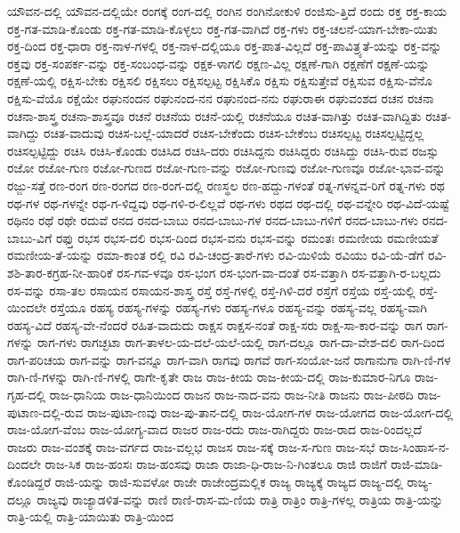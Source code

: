 {ಯೌವನ-ದಲ್ಲಿ
ಯೌವನ-ದಲ್ಲಿಯೇ
ರಂಗಕ್ಕೆ
ರಂಗ-ದಲ್ಲಿ
ರಂಗಿನ
ರಂಗಿನೋಕುಳಿ
ರಂಜಿಸು-ತ್ತಿದೆ
ರಂದು
ರಕ್ತ
ರಕ್ತ-ಕಾಯ
ರಕ್ತ-ಗತ-ಮಾಡಿ-ಕೊಂಡು
ರಕ್ತ-ಗತ-ಮಾಡಿ-ಕೊಳ್ಳಲು
ರಕ್ತ-ಗತ-ವಾಗಿದೆ
ರಕ್ತ-ಗಳು
ರಕ್ತ-ಚಲನೆ-ಯಾಗ-ಬೇಕಾ-ಯಿತು
ರಕ್ತ-ದಿಂದ
ರಕ್ತ-ಧಾರಾ
ರಕ್ತ-ನಾಳ-ಗಳಲ್ಲಿ
ರಕ್ತ-ನಾಳ-ದಲ್ಲಿಯೂ
ರಕ್ತ-ಪಾತ-ವಿಲ್ಲದೆ
ರಕ್ತ-ಪಾವಿತ್ರ್ಯತೆ-ಯನ್ನು
ರಕ್ತ-ವನ್ನು
ರಕ್ತವು
ರಕ್ತ-ಸಂಪರ್ಕ-ವನ್ನು
ರಕ್ತ-ಸಂಬಂಧ-ವನ್ನು
ರಕ್ಷಕ-ಳಾಗಲಿ
ರಕ್ಷಣ-ವಿಲ್ಲ
ರಕ್ಷಣೆ-ಗಾಗಿ
ರಕ್ಷಣೆಗೆ
ರಕ್ಷಣೆ-ಯನ್ನು
ರಕ್ಷಣೆ-ಯಲ್ಲಿ
ರಕ್ಷಿಸ-ಬೇಕು
ರಕ್ಷಿಸಲಿ
ರಕ್ಷಿಸಲು
ರಕ್ಷಿಸಲ್ಪಟ್ಟ
ರಕ್ಷಿಸಿಕೊ
ರಕ್ಷಿಸು
ರಕ್ಷಿಸುತ್ತೇವೆ
ರಕ್ಷಿಸುವ
ರಕ್ಷಿಸು-ವೆನೊ
ರಕ್ಷಿಸು-ವೆಯೊ
ರಕ್ಷೆಯೇ
ರಘುನಂದನ
ರಘುನಂದ-ನನ
ರಘುನಂದ-ನನು
ರಘುರಾಈ
ರಘುವಂಶದ
ರಚನ
ರಚನಾ
ರಚನಾ-ಶಾಸ್ತ್ರ
ರಚನಾ-ಶಾಸ್ತ್ರವೂ
ರಚನೆ
ರಚನೆಯ
ರಚನೆ-ಯಲ್ಲಿ
ರಚನೆಯೂ
ರಚಿತ-ವಾಗಿತ್ತು
ರಚಿತ-ವಾಗಿದ್ದಿತು
ರಚಿತ-ವಾಗಿದ್ದು
ರಚಿತ-ವಾದುವು
ರಚಿಸ-ಬಲ್ಲೆ-ಯಾದರೆ
ರಚಿಸ-ಬೇಕೆಂದು
ರಚಿಸ-ಬೇಕೆಂಬ
ರಚಿಸಲ್ಪಟ್ಟ
ರಚಿಸಲ್ಪಟ್ಟಿದ್ದಲ್ಲ
ರಚಿಸಲ್ಪಟ್ಟಿದ್ದು
ರಚಿಸಿ
ರಚಿಸಿ-ಕೊಂಡು
ರಚಿಸಿದ
ರಚಿಸಿ-ದರು
ರಚಿಸಿದ್ದನು
ರಚಿಸಿದ್ದರು
ರಚಿಸಿದ್ದು
ರಚಿಸಿ-ರುವ
ರಜಸ್ಸು
ರಜೋ
ರಜೋ-ಗುಣ
ರಜೋ-ಗುಣದ
ರಜೋ-ಗುಣ-ವನ್ನು
ರಜೋ-ಗುಣವು
ರಜೋ-ಗುಣವೂ
ರಜೋ-ಭಾವ-ವನ್ನು
ರಜ್ಜು-ಸತ್ತೆ
ರಣ-ರಂಗ
ರಣ-ರಂಗದ
ರಣ-ರಂಗ-ದಲ್ಲಿ
ರಣಸ್ಥಲ
ರಣ-ಹದ್ದು-ಗಳಂತೆ
ರತ್ನ-ಗಳನ್ನವ-ರಿಗೆ
ರತ್ನ-ಗಳು
ರಥ
ರಥ-ಗಳ
ರಥ-ಗಳನ್ನೇ
ರಥ-ಗ-ಳಿದ್ದವು
ರಥ-ಗಳಿ-ರ-ಲಿಲ್ಲವೆ
ರಥ-ಗಳು
ರಥದ
ರಥ-ದಲ್ಲಿ
ರಥ-ವನ್ನೇರಿ
ರಥ-ವಿದೆ-ಯಷ್ಟೆ
ರಥಿನಂ
ರಥೆ
ರಥೇ
ರದುವೆ
ರನದ
ರನದ-ಬಾಬು
ರನದ-ಬಾಬು-ಗಳ
ರನದ-ಬಾಬು-ಗಳಿಗೆ
ರನದ-ಬಾಬು-ಗಳು
ರನದ-ಬಾಬು-ವಿಗೆ
ರಫ್ತು
ರಭಸ
ರಭಸ-ದಲಿ
ರಭಸ-ದಿಂದ
ರಭಸ-ವನು
ರಭಸ-ವನ್ನು
ರಮಂತಃ
ರಮಣೀಯ
ರಮಣೀಯತೆ
ರಮಣೀಯ-ತೆ-ಯನ್ನು
ರಮಾ-ಕಾಂತ
ರಲ್ಲಿ
ರವಿ
ರವಿ-ಚಂದ್ರ-ತಾರೆ-ಗಳು
ರವಿ-ಯಿಳಿಯೆ
ರವಿಯು
ರವಿ-ಯೆ-ಡೆಗೆ
ರವಿ-ಶಶಿ-ತಾರ-ಕಗ್ರಹ-ನೀ-ಹಾರಿಕೆ
ರಸ-ಗವ-ಳವೂ
ರಸ-ಭಂಗ
ರಸ-ಭಂಗ-ವಾ-ದಂತೆ
ರಸ-ವತ್ತಾಗಿ
ರಸ-ವತ್ತಾಗಿ-ರ-ಬಲ್ಲದು
ರಸ-ವನ್ನು
ರಸಾ-ತಲ
ರಸಾಯನ
ರಸಾಯನ-ಶಾಸ್ತ್ರ
ರಸ್ತೆ
ರಸ್ತೆ-ಗಳಲ್ಲಿ
ರಸ್ತೆ-ಗಿಳಿ-ದರೆ
ರಸ್ತೆಗೆ
ರಸ್ತೆಯ
ರಸ್ತೆ-ಯಲ್ಲಿ
ರಸ್ತೆ-ಯಿಂದಲೇ
ರಸ್ತೆಯೂ
ರಹಸ್ಯ
ರಹಸ್ಯ-ಗಳನ್ನು
ರಹಸ್ಯ-ಗಳು
ರಹಸ್ಯ-ಗಳೂ
ರಹಸ್ಯ-ವನ್ನು
ರಹಸ್ಯ-ವಲ್ಲ
ರಹಸ್ಯ-ವಾಗಿ
ರಹಸ್ಯ-ವಿದೆ
ರಹಸ್ಯ-ವೇ-ನೆಂದರೆ
ರಹಿತ-ವಾದುದು
ರಾಕ್ಷಸ
ರಾಕ್ಷಸ-ನಂತೆ
ರಾಕ್ಷ-ಸರು
ರಾಕ್ಷ-ಸಾ-ಕಾರ-ವನ್ನು
ರಾಗ
ರಾಗ-ಗಳನ್ನು
ರಾಗ-ಗಳು
ರಾಗಚ್ಛಟಾ
ರಾಗ-ತಾಳಲ-ಯ-ದಲೆ-ಯಲೆ-ಯಲ್ಲಿ
ರಾಗ-ದಲ್ಲೂ
ರಾಗ-ದಾ-ವೇಶ-ದಲಿ
ರಾಗ-ದಿಂದ
ರಾಗ-ಪರಿಚಯ
ರಾಗ-ವನ್ನು
ರಾಗ-ವನ್ನೂ
ರಾಗ-ವಾಗಿ
ರಾಗವು
ರಾಗವೆ
ರಾಗ-ಸಂಯೋ-ಜನೆ
ರಾಗಾನುಗಾ
ರಾಗಿ-ಣಿ-ಗಳ
ರಾಗಿ-ಣಿ-ಗಳನ್ನು
ರಾಗಿ-ಣಿ-ಗಳಲ್ಲಿ
ರಾಗೇ-ಕೃತೇ
ರಾಜ
ರಾಜ-ಕೀಯ
ರಾಜ-ಕೀಯ-ದಲ್ಲಿ
ರಾಜ-ಕುಮಾರ-ನಿಗೂ
ರಾಜ-ಗೃಹ-ದಲ್ಲಿ
ರಾಜ-ಧಾನಿಯ
ರಾಜ-ಧಾನಿಯಿಂದ
ರಾಜನ
ರಾಜ-ನಾದ-ವನು
ರಾಜ-ನೀತಿ
ರಾಜನು
ರಾಜ-ಪೀಠದಿ
ರಾಜ-ಪುಟಾಣ-ದಲ್ಲಿ-ರುವ
ರಾಜ-ಪುಟಾ-ಣವು
ರಾಜ-ಪು-ತಾನ-ದಲ್ಲಿ
ರಾಜ-ಯೋಗ-ಗಳ
ರಾಜ-ಯೋಗದ
ರಾಜ-ಯೋಗ-ದಲ್ಲಿ
ರಾಜ-ಯೋಗ-ವೆಂಬ
ರಾಜ-ಯೋಗ್ಯ-ವಾದ
ರಾಜರ
ರಾಜ-ರದು
ರಾಜ-ರಾಗಿದ್ದರು
ರಾಜ-ರಾದ
ರಾಜ-ರಿಂದಲ್ಲದೆ
ರಾಜರು
ರಾಜ-ವಂಶಕ್ಕೆ
ರಾಜ-ವರ್ಗದ
ರಾಜ-ವಲ್ಲಭ
ರಾಜಸ
ರಾಜ-ಸಕ್ಕೆ
ರಾಜ-ಸ-ಗುಣ
ರಾಜ-ಸಭೆ
ರಾಜ-ಸಿಂಹಾಸ-ನ-ದಿಂದಲೇ
ರಾಜ-ಸಿಕ
ರಾಜ-ಹಂಸಃ
ರಾಜ-ಹಂಸವು
ರಾಜಾ
ರಾಜಾ-ಧಿ-ರಾಜ-ನಿ-ಗಿಂತಲೂ
ರಾಜಿ
ರಾಜಿಗೆ
ರಾಜಿ-ಮಾಡಿ-ಕೊಂಡಿದ್ದರೆ
ರಾಜಿ-ಯನ್ನು
ರಾಜಿ-ಸುವಳೋ
ರಾಜೇ
ರಾಜೇಂದ್ರಮಲ್ಲಿಕ
ರಾಜ್ಯ
ರಾಜ್ಯಕ್ಕೆ
ರಾಜ್ಯದ
ರಾಜ್ಯ-ದಲ್ಲಿ
ರಾಜ್ಯ-ದಲ್ಲೂ
ರಾಜ್ಯವು
ರಾಜ್ಯಾಡಳಿತ-ವನ್ನು
ರಾಣಿ
ರಾಣಿ-ರಾಸ-ಮ-ಣಿಯ
ರಾತ್ರಿ
ರಾತ್ರಿಂ
ರಾತ್ರಿ-ಗಳಲ್ಲ
ರಾತ್ರಿಯ
ರಾತ್ರಿ-ಯನ್ನು
ರಾತ್ರಿ-ಯಲ್ಲಿ
ರಾತ್ರಿ-ಯಾಯಿತು
ರಾತ್ರಿ-ಯಿಂದ
}
